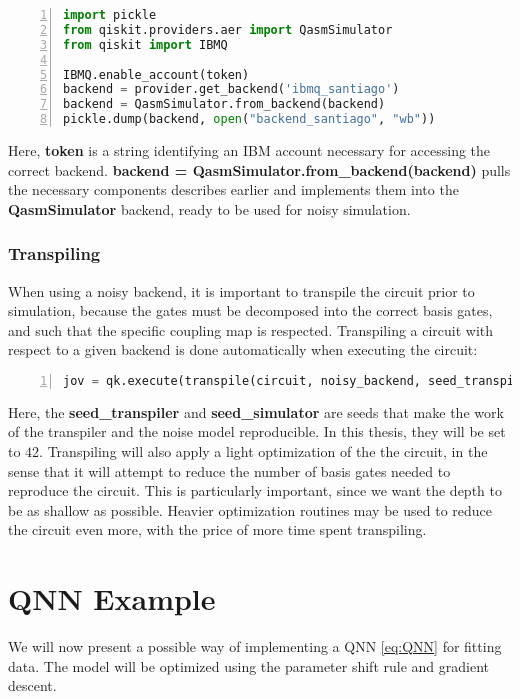 \begin{lstlisting}[language=python, numbers=left]
import pickle
from qiskit.providers.aer import QasmSimulator
from qiskit import IBMQ

IBMQ.enable_account(token)
backend = provider.get_backend('ibmq_santiago')
backend = QasmSimulator.from_backend(backend)
pickle.dump(backend, open("backend_santiago", "wb"))
\end{lstlisting}

Here, \textbf{token} is a string identifying an IBM account necessary for accessing the correct backend. 
\textbf{backend = QasmSimulator.from\_backend(backend)} pulls the necessary components describes earlier and implements them into the \textbf{QasmSimulator} backend, ready to be used for noisy simulation. 

\subsubsection*{Transpiling}
When using a noisy backend, it is important to transpile the circuit prior to simulation, because the gates must be decomposed into the correct basis gates, and such that the specific coupling map is respected. Transpiling a circuit with respect to a given backend is done automatically when executing the circuit:

\begin{lstlisting}[language=python, numbers=left]
jov = qk.execute(transpile(circuit, noisy_backend, seed_transpiler=42, seed_simulator=42)
\end{lstlisting}
Here, the \textbf{seed\_transpiler} and \textbf{seed\_simulator} are seeds that make the work of the transpiler and the noise model reproducible. In this thesis, they will be set to $42$. Transpiling will also apply a light optimization of the the circuit, in the sense that it will attempt to reduce the number of basis gates needed to reproduce the circuit. This is particularly important, since we want the depth to be as shallow as possible. Heavier optimization routines may be used to reduce the circuit even more, with the price of more time spent transpiling.  






\section{QNN Example}\label{sec:QNNimpement}
We will now present a possible way of implementing a QNN \autoref{eq:QNN} for fitting data. The model will be optimized using the parameter shift rule and gradient descent. 

